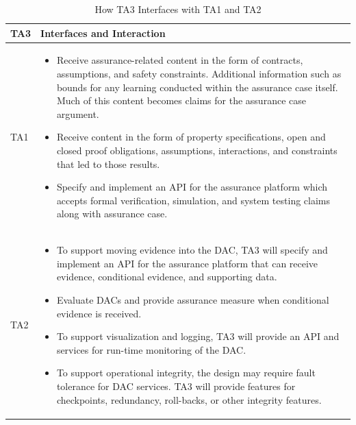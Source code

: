 

\begin{table}
\caption{How TA3 Interfaces with TA1 and TA2}
  \centering
  {\footnotesize
\begin{tabular}{|m{.5in}|m{5.65in}|} 
\hline
\textbf{TA3 } & \textbf{Interfaces and Interaction} 
\\\hline
 TA1 & 
\begin{itemize}[leftmargin=*,topsep=3pt]
\setlength\itemsep{0em} 
\item Receive assurance-related content in the form of contracts, assumptions, and safety constraints.  Additional information such as  bounds for any learning conducted within the assurance case itself.  Much of this content becomes claims for the assurance case argument.   
\item Receive content in the form of property specifications, open and closed proof obligations, assumptions, interactions, and constraints that led to those results.  
\item Specify and implement an API for the assurance platform which accepts formal verification, simulation, and system testing claims along with assurance case. 
\end{itemize}
\\ \hline
TA2 & 
\begin{itemize}[leftmargin=*,topsep=3pt]
\setlength\itemsep{0em}
\item To support moving evidence into the DAC, TA3 will specify and implement an API for the assurance platform that can receive evidence, conditional evidence, and supporting data.  
\item Evaluate DACs and provide assurance measure when conditional evidence is received. 
\item To support visualization and logging, TA3 will provide an API and services for run-time monitoring of the DAC.
\item To support operational integrity, the design may require fault tolerance for DAC services.  TA3 will provide features for checkpoints, redundancy, roll-backs, or other integrity features. 
\end{itemize}
\\\cline{1-2}
\hline
\end{tabular}
}
\label{tab:ta3:if}
\end{table}




